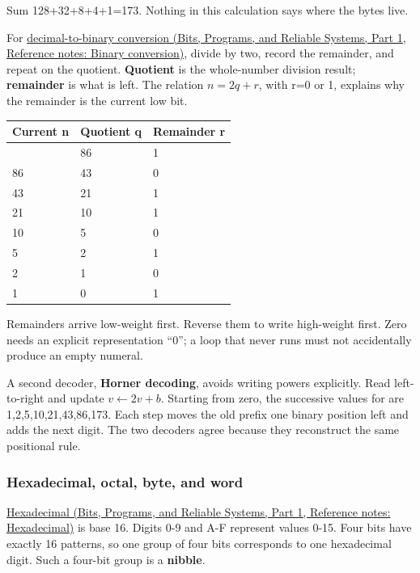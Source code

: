 Sum 128+32+8+4+1=173. Nothing in this calculation says where the bytes live.

For \href{../01-Bits-Programs-and-Reliable-Systems-P01/main.pdf\#nameddest=appendix-dc552784a2c0}{decimal-to-binary conversion (Bits, Programs, and Reliable Systems, Part 1, Reference notes: Binary conversion)}, divide by two, record the remainder, and repeat on the quotient. \textbf{Quotient} is the whole-number division result; \textbf{remainder} is what is left. The relation \(n=2q+r\), with r=0 or 1, explains why the remainder is the current low bit.

{\def\LTcaptype{none} %
\begin{longtable}[]{@{}lll@{}}
\toprule\noalign{}
Current n & Quotient q & Remainder r \\
\midrule\noalign{}
\endhead
\bottomrule\noalign{}
\endlastfoot
173 & 86 & 1 \\
86 & 43 & 0 \\
43 & 21 & 1 \\
21 & 10 & 1 \\
10 & 5 & 0 \\
5 & 2 & 1 \\
2 & 1 & 0 \\
1 & 0 & 1 \\
\end{longtable}
}

Remainders arrive low-weight first. Reverse them to write  high-weight first. Zero needs an explicit representation ``0''; a loop that never runs must not accidentally produce an empty numeral.

A second decoder, \textbf{Horner decoding}, avoids writing powers explicitly. Read left-to-right and update \(v\leftarrow2v+b\). Starting from zero, the successive values for  are 1,2,5,10,21,43,86,173. Each step moves the old prefix one binary position left and adds the next digit. The two decoders agree because they reconstruct the same positional rule.

\subsubsection{Hexadecimal, octal, byte, and word}\label{05-engine-i-ch001-hexadecimal-octal-byte-and-word}

\hypertarget{05-engine-i-ch001-hexadecimal-octal-byte-and-word}{}

\href{../01-Bits-Programs-and-Reliable-Systems-P01/main.pdf\#nameddest=appendix-6b8075763724}{Hexadecimal (Bits, Programs, and Reliable Systems, Part 1, Reference notes: Hexadecimal)} is base 16. Digits 0-9 and A-F represent values 0-15. Four bits have exactly 16 patterns, so one group of four bits corresponds to one hexadecimal digit. Such a four-bit group is a \textbf{nibble}.

